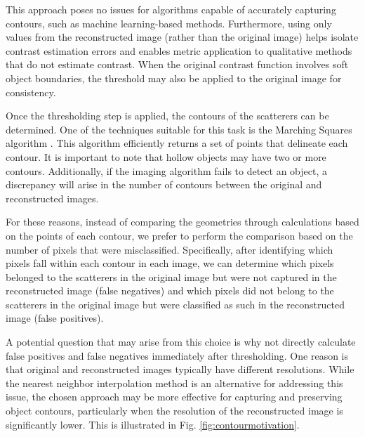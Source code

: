 \documentclass{ieeeaccess}
\begin{document}
        This approach poses no issues for algorithms capable of accurately capturing contours, such as machine learning-based methods. Furthermore, using only values from the reconstructed image (rather than the original image) helps isolate contrast estimation errors and enables metric application to qualitative methods that do not estimate contrast. When the original contrast function involves soft object boundaries, the threshold may also be applied to the original image for consistency.

        Once the thresholding step is applied, the contours of the scatterers can be determined. One of the techniques suitable for this task is the Marching Squares algorithm \cite{lorensen1987marching}. This algorithm efficiently returns a set of points that delineate each contour. It is important to note that hollow objects may have two or more contours. Additionally, if the imaging algorithm fails to detect an object, a discrepancy will arise in the number of contours between the original and reconstructed images.
        
        For these reasons, instead of comparing the geometries through calculations based on the points of each contour, we prefer to perform the comparison based on the number of pixels that were misclassified. Specifically, after identifying which pixels fall within each contour in each image, we can determine which pixels belonged to the scatterers in the original image but were not captured in the reconstructed image (false negatives) and which pixels did not belong to the scatterers in the original image but were classified as such in the reconstructed image (false positives).
        
        A potential question that may arise from this choice is why not directly calculate false positives and false negatives immediately after thresholding. One reason is that original and reconstructed images typically have different resolutions. While the nearest neighbor interpolation method is an alternative for addressing this issue, the chosen approach may be more effective for capturing and preserving object contours, particularly when the resolution of the reconstructed image is significantly lower. This is illustrated in Fig. \ref{fig:contourmotivation}.
\end{document}

